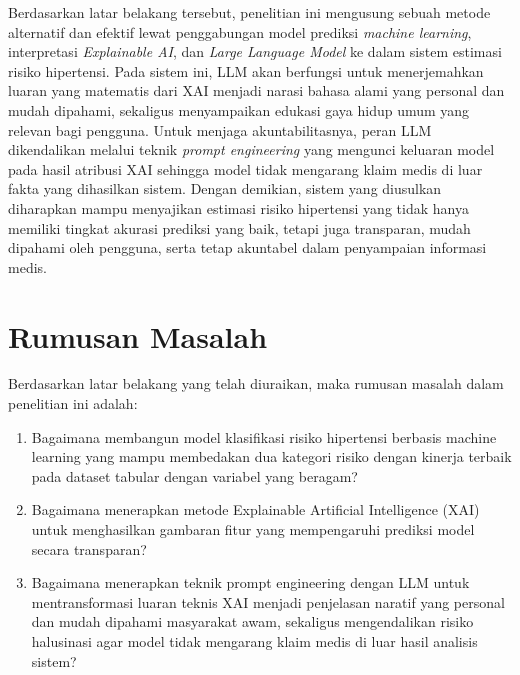 Berdasarkan latar belakang tersebut, penelitian ini mengusung sebuah metode alternatif dan efektif lewat penggabungan model prediksi \textit{machine learning}, interpretasi \textit{Explainable AI}, dan \textit{Large Language Model} ke dalam sistem estimasi risiko hipertensi. Pada sistem ini, LLM akan berfungsi untuk menerjemahkan luaran yang matematis dari XAI menjadi narasi bahasa alami yang personal dan mudah dipahami, sekaligus menyampaikan edukasi gaya hidup umum yang relevan bagi pengguna. Untuk menjaga akuntabilitasnya, peran LLM dikendalikan melalui teknik \textit{prompt engineering} yang mengunci keluaran model pada hasil atribusi XAI sehingga model tidak mengarang klaim medis di luar fakta yang dihasilkan sistem. Dengan demikian, sistem yang diusulkan diharapkan mampu menyajikan estimasi risiko hipertensi yang tidak hanya memiliki tingkat akurasi prediksi yang baik, tetapi juga transparan, mudah dipahami oleh pengguna, serta tetap akuntabel dalam penyampaian informasi medis.

\section{Rumusan Masalah}
Berdasarkan latar belakang yang telah diuraikan, maka rumusan masalah dalam penelitian ini adalah:
\begin{enumerate}
\item Bagaimana membangun model klasifikasi risiko hipertensi berbasis machine learning yang mampu membedakan dua kategori risiko dengan kinerja terbaik pada dataset tabular dengan variabel yang beragam?
\item Bagaimana menerapkan metode Explainable Artificial Intelligence (XAI) untuk menghasilkan gambaran fitur yang mempengaruhi prediksi model secara transparan?
\item Bagaimana menerapkan teknik prompt engineering dengan LLM untuk mentransformasi luaran teknis XAI menjadi penjelasan naratif yang personal dan mudah dipahami masyarakat awam, sekaligus mengendalikan risiko halusinasi agar model tidak mengarang klaim medis di luar hasil analisis sistem?
\end{enumerate}

